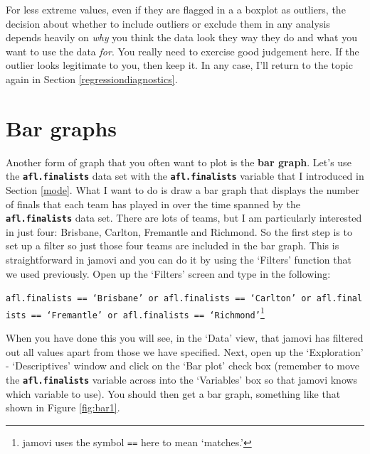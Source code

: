\documentclass[
]{book}
\begin{document}
For less extreme values, even if they are flagged in a a boxplot as outliers, the decision about whether to include outliers or exclude them in any analysis depends heavily on \emph{why} you think the data look they way they do and what you want to use the data \emph{for}. You really need to exercise good judgement here. If the outlier looks legitimate to you, then keep it. In any case, I'll return to the topic again in Section \ref{regressiondiagnostics}.

\hypertarget{bargraph}{%
\section{Bar graphs}\label{bargraph}}

Another form of graph that you often want to plot is the {\textbf{bar graph}}. Let's use the \textbf{\texttt{afl.finalists}} data set with the \textbf{\texttt{afl.finalists}} variable that I introduced in Section \ref{mode}. What I want to do is draw a bar graph that displays the number of finals that each team has played in over the time spanned by the \textbf{\texttt{afl.finalists}} data set. There are lots of teams, but I am particularly interested in just four: Brisbane, Carlton, Fremantle and Richmond. So the first step is to set up a filter so just those four teams are included in the bar graph. This is straightforward in jamovi and you can do it by using the `Filters' function that we used previously. Open up the `Filters' screen and type in the following:

\texttt{afl.finalists\ ==\ ‘Brisbane’\ or\ afl.finalists\ ==\ ‘Carlton’\ or\ afl.finalists\ ==\ ‘Fremantle’\ or\ afl.finalists\ ==\ ‘Richmond’}\footnote{jamovi uses the symbol \texttt{==} here to mean `matches.'}

When you have done this you will see, in the `Data' view, that jamovi has filtered out all values apart from those we have specified. Next, open up the `Exploration' - `Descriptives' window and click on the `Bar plot' check box (remember to move the \textbf{\texttt{afl.finalists}} variable across into the `Variables' box so that jamovi knows which variable to use). You should then get a bar graph, something like that shown in Figure \ref{fig:bar1}.
\end{document}
